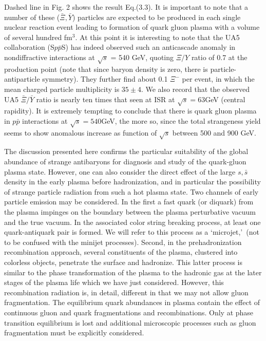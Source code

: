 \begin{mdframed}[linecolor=gray,roundcorner=12pt,backgroundcolor=Dandelion!15,linewidth=1pt,leftmargin=0cm,rightmargin=0cm,topline=true,bottomline=true,skipabove=12pt]
Dashed line in Fig. 2 shows the result Eq.(3.3). It is important to note that a number of these ($\bar \Xi , \bar Y$) particles are expected to be produced in each single nuclear reaction event leading to formation of quark gluon plasma with a volume of several hundred fm$^3$. At this point it is interesting to note that the UA5 collaboration  
(S$  p\bar p  $S) has indeed observed such an anticascade anomaly\footnotemark[6] in nondiffractive interactions at 
$\sqrt{s}$ = 540 GeV, quoting $\Xi/Y$ ratio of 0.7 at the production point  (note that since baryon density is zero, there is particle-antiparticle symmetry). They further find about 0.1 $\Xi^-$ per event, in which the mean charged particle multiplicity is  $35\pm 4$. We also record that the observed UA5  $\bar \Xi/\bar Y$  ratio is nearly ten times that seen at ISR at $\sqrt{s}=63$\;GeV (central rapidity)\footnotemark[7]. It is extremely tempting to conclude that there is quark gluon plasma in $p\bar p$ interactions at  $\sqrt{s}=540$\;GeV, the more so, since the total strangeness yield seems to show anomalous increase as function of 
$\sqrt{s}$ between 500 and 900 GeV.

The discussion presented here confirms the particular suitability of the global abundance of strange antibaryons for diagnosis and study of the quark-gluon plasma state. However, one can also consider the direct effect of the large $s, \bar s$ density in the early plasma before hadronization, and in particular the possibility of strange particle radiation from such a hot plasma state. Two channels of early particle emission may be considered. In the first a fast quark (or diquark) from the plasma impinges on the boundary between the plasma perturbative vacuum and the true vacuum. In the associated color string breaking process, at least one quark-antiquark pair is formed. We will refer to this process as a \lq microjet,\rq\ (not to be confused with the minijet processes). Second, in the prehadronization recombination approach, several constituents of the plasma, clustered into colorless objects, penetrate the surface and hadronize. This latter process is similar to the phase transformation of the plasma to the hadronic gas at the later stages of the plasma life which we have just considered. However, this recombination radiation is, in detail, different in that we may not allow gluon fragmentation. The equilibrium quark abundances in plasma contain the effect of continuous gluon and quark fragmentations and recombinations. Only at phase transition equilibrium is lost and additional microscopic processes such as gluon fragmentation must be explicitly considered.


\end{mdframed}
